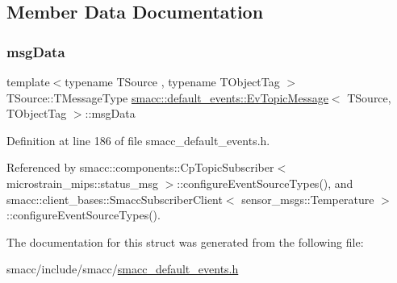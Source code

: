 \subsection{Member Data Documentation}
\mbox{\label{structsmacc_1_1default__events_1_1EvTopicMessage_a82384568b702a0c3a3dc2fbe7eeefea9}} 
\subsubsection{\texorpdfstring{msg\+Data}{msgData}}
{\footnotesize\ttfamily template$<$typename T\+Source , typename T\+Object\+Tag $>$ \\
T\+Source\+::\+T\+Message\+Type \hyperlink{structsmacc_1_1default__events_1_1EvTopicMessage}{smacc\+::default\+\_\+events\+::\+Ev\+Topic\+Message}$<$ T\+Source, T\+Object\+Tag $>$\+::msg\+Data}



Definition at line 186 of file smacc\+\_\+default\+\_\+events.\+h.



Referenced by smacc\+::components\+::\+Cp\+Topic\+Subscriber$<$ microstrain\+\_\+mips\+::status\+\_\+msg $>$\+::configure\+Event\+Source\+Types(), and smacc\+::client\+\_\+bases\+::\+Smacc\+Subscriber\+Client$<$ sensor\+\_\+msgs\+::\+Temperature $>$\+::configure\+Event\+Source\+Types().



The documentation for this struct was generated from the following file\+:\begin{DoxyCompactItemize}
\item 
smacc/include/smacc/\hyperlink{smacc__default__events_8h}{smacc\+\_\+default\+\_\+events.\+h}\end{DoxyCompactItemize}
